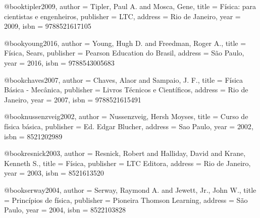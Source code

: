 @book{tipler2009,
  author = {Tipler, Paul A. and Mosca, Gene},
  title = {Física: para cientistas e engenheiros},
  publisher = {LTC},
  address = {Rio de Janeiro},
  year = {2009},
  isbn = {9788521617105}%
}

@book{young2016,
  author = {Young, Hugh D. and Freedman, Roger A.},
  title = {Física, Sears},
  publisher = {Pearson Education do Brasil},
  address = {São Paulo},
  year = {2016},
  isbn = {9788543005683}%
}

@book{chaves2007,
  author = {Chaves, Alaor and Sampaio, J. F.},
  title = {Física Básica - Mecânica},
  publisher = {Livros Técnicos e Científicos},
  address = {Rio de Janeiro},
  year = {2007},
  isbn = {9788521615491}
}

@book{nussenzveig2002,
  author = {Nussenzveig, Hersh Moyses},
  title = {Curso de física básica},
  publisher = {Ed. Edgar Blucher},
  address = {Sao Paulo},
  year = {2002}, %
  isbn = {8521202989}%
}

@book{resnick2003,
  author = {Resnick, Robert and Halliday, David and Krane, Kenneth S.},
  title = {Física},
  publisher = {LTC Editora},
  address = {Rio de Janeiro},
  year = {2003}, %
  isbn = {8521613520}%
}

@book{serway2004,
  author = {Serway, Raymond A. and Jewett, Jr., John W.},
  title = {Princípios de física},
  publisher = {Pioneira Thomson Learning},
  address = {São Paulo},
  year = {2004},
  isbn = {8522103828}%
}

